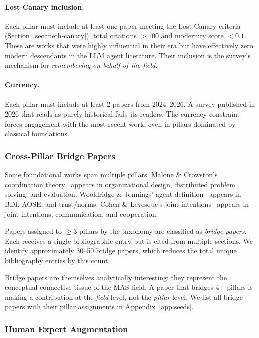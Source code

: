 \documentclass{article}
\begin{document}
\paragraph{Lost Canary inclusion.}
Each pillar must include at least one paper meeting the Lost Canary criteria
(Section~\ref{sec:meth-canary}): total citations $> 100$ and modernity score
$< 0.1$. These are works that were highly influential in their era but have
effectively zero modern descendants in the LLM agent literature. Their
inclusion is the survey's mechanism for \emph{remembering on behalf of the field}.

\paragraph{Currency.}
Each pillar must include at least 2 papers from 2024--2026. A survey published
in 2026 that reads as purely historical fails its readers. The currency constraint
forces engagement with the most recent work, even in pillars dominated by
classical foundations.

\subsubsection{Cross-Pillar Bridge Papers}

Some foundational works span multiple pillars. Malone \& Crowston's coordination
theory~\citep{malone1994interdisciplinary} appears in organizational design,
distributed problem solving, and evaluation. Wooldridge \& Jennings'
agent definition~\citep{wooldridge1995intelligent} appears in BDI, AOSE, and
trust/norms. Cohen \& Levesque's joint intentions~\citep{cohen1990intention}
appears in joint intentions, communication, and cooperation.

Papers assigned to $\geq 3$ pillars by the taxonomy are classified as
\emph{bridge papers}. Each receives a single bibliographic entry but is cited
from multiple sections. We identify approximately 30--50 bridge papers, which
reduces the total unique bibliography entries by this count.

Bridge papers are themselves analytically interesting: they represent the
conceptual connective tissue of the MAS field. A paper that bridges 4+ pillars
is making a contribution at the \emph{field} level, not the \emph{pillar} level.
We list all bridge papers with their pillar assignments in
Appendix~\ref{app:seeds}.

\subsubsection{Human Expert Augmentation}
\label{sec:meth-ref-human}
\end{document}
